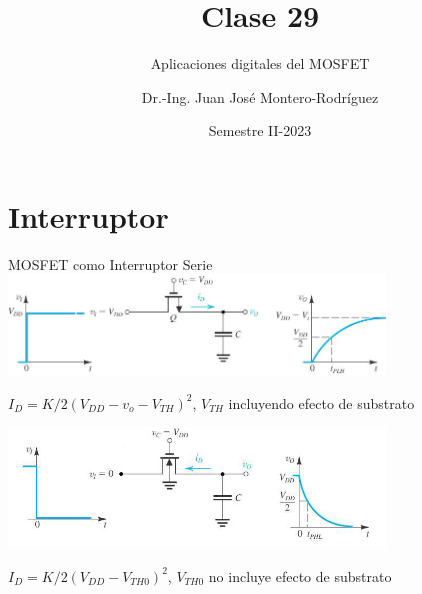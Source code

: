 \documentclass[aspectratio=169,t]{beamer}
\title{Clase 29}
\subtitle{Aplicaciones digitales del MOSFET}
\author{Dr.-Ing. Juan José Montero-Rodríguez}
\institute{Escuela de Ingeniería Electrónica}
\date{Semestre II-2023}
\begin{document}
\begin{frame}
\titlepage
\end{frame}


\section{Interruptor}
\begin{frame}{MOSFET como Interruptor Serie}
\centering
\includegraphics[width=10cm]{MOSserie1}

$I_D = K/2 (V_{DD} - v_o - V_{TH})^2$, $V_{TH}$ incluyendo efecto de substrato

\vspace{5mm}
\includegraphics[width=10cm]{MOSserie2}

$I_D = K/2 (V_{DD} - V_{TH0})^2$, $V_{TH0}$ no incluye efecto de substrato
\end{frame}
\end{document}
